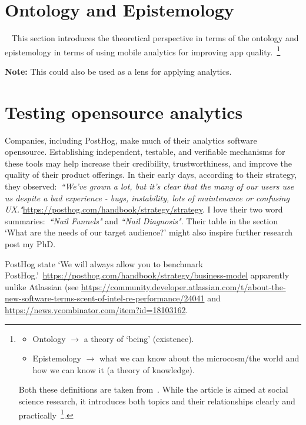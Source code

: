 \section{Ontology and Epistemology}~\label{section-ontology-and-episetemology}
This section introduces the theoretical perspective in terms of the ontology and epistemology in terms of using mobile analytics for improving app quality.~\footnote{
\begin{itemize}
    \item Ontology \( \rightarrow \) a theory of `being' (existence).
    \item Epistemology \( \rightarrow \) what we can know about the microcosm/the world and how we can know it (a theory of knowledge).
\end{itemize}

Both these definitions are taken from~\cite{marsh2002skin}. While the article is aimed at social science research, it introduces both topics and their relationships clearly and practically~\footnote{Note: newer versions of the introductory material is published in a book: \href{https://www.macmillanihe.com/page/detail/Theory-and-Methods-in-Political-Science/?K=9781137603517}{\emph{``Theory and Methods in Political Science ( Edition)".}}}.
}


\textbf{Note:} This could also be used as a lens for applying analytics.


\section{Testing opensource analytics}
Companies, including PostHog, make much of their analytics software opensource. Establishing independent, testable, and verifiable mechanisms for these tools may help increase their credibility, trustworthiness, and improve the quality of their product offerings. In their early days, according to their strategy, they observed:~\emph{``We’ve grown a lot, but it’s clear that the many of our users use us despite a bad experience - bugs, instability, lots of maintenance or confusing UX."}\url{https://posthog.com/handbook/strategy/strategy}. I love their two word summaries:~\emph{``Nail Funnels"} and \emph{``Nail Diagnosis"}. Their table in the section `What are the needs of our target audience?' might also inspire further research post my PhD.

PostHog state `We will always allow you to benchmark PostHog.'~\url{https://posthog.com/handbook/strategy/business-model} apparently unlike Atlassian (see \url{https://community.developer.atlassian.com/t/about-the-new-software-terms-scent-of-intel-re-performance/24041} and \url{https://news.ycombinator.com/item?id=18103162}.

